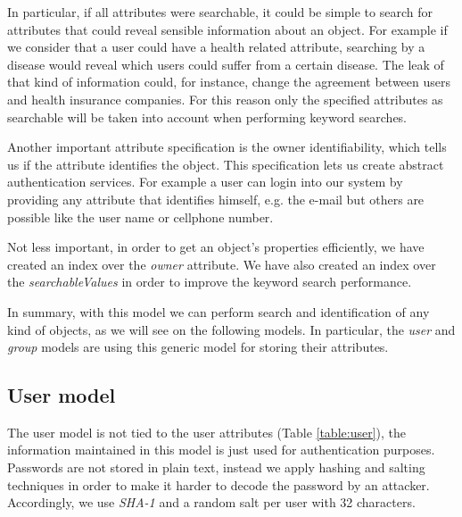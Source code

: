 In particular, if all attributes were searchable, it could be simple to search for attributes that could reveal sensible information about an object. For example if we consider that a user could have a health related attribute, searching by a disease would reveal which users could suffer from a certain disease. The leak of that kind of information could, for instance, change the agreement between users and health insurance companies. For this reason only the specified attributes as searchable will be taken into account when performing keyword searches.

Another important attribute specification is the owner identifiability, which tells us if the attribute identifies the object. This specification lets us create abstract authentication services. For example a user can login into our system by providing any attribute that identifies himself, e.g. the e-mail but others are possible like the user name or cellphone number. 

Not less important, in order to get an object's properties efficiently, we have created an index over the \emph{owner} attribute. We have also created an index over the \emph{searchableValues} in order to improve the keyword search performance.

In summary, with this model we can perform search and identification of any kind of objects, as we will see on the following models. In particular, the \emph{user} and \emph{group} models are using this generic model for storing their attributes. 


\subsection{User model}

The user model is not tied to the user attributes (Table \ref{table:user}), the information maintained in this model is just used for authentication purposes. Passwords are not stored in plain text, instead we apply hashing and salting techniques \cite{password} in order to make it harder to decode the password by an attacker. Accordingly, we use \emph{SHA-1} and a random salt per user with 32 characters.

